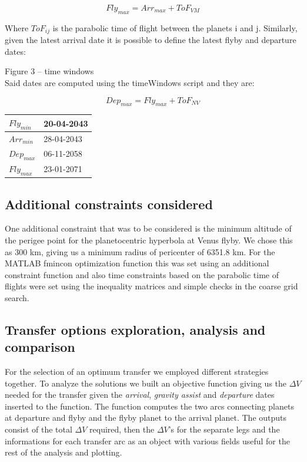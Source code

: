 \documentclass[11pt,a4paper]{report}
\begin{document}
\begin{equation*}
    Fly_{max}=Arr_{max}+ ToF_{VM}
\end{equation*}

Where $ToF_{ij}$ is the parabolic time of flight between the planets i and j.
Similarly, given the latest arrival date it is possible to define the latest flyby and departure dates:

Figure 3 – time windows\\
Said dates are computed using the timeWindows script and they are:

\begin{equation*}
    Dep_{max}=Fly_{max}+ ToF_{NV}
\end{equation*}

\begin{table}[H]
\centering
\begin{tabular}{|l|l|}
\hline
$Fly_{min}$ & 20-04-2043 \\ \hline
$Arr_{min}$ & 28-04-2043 \\ \hline
$Dep_{max}$ & 06-11-2058 \\ \hline
$Fly_{max}$ & 23-01-2071 \\ \hline
\end{tabular}
\end{table}



\subsection{Additional constraints considered}
One additional constraint that was to be considered is the minimum altitude of the perigee point for the planetocentric hyperbola at Venus flyby. We chose this as 300 km, giving us a minimum radius of pericenter of 6351.8 km. For the MATLAB fmincon optimization function this was set using an additional constraint function and also time constraints based on the parabolic time of flights were set using the inequality matrices and simple checks in the coarse grid search.

\subsection{Transfer options exploration, analysis and comparison}
For the selection of an optimum transfer we employed different strategies together.
To analyze the solutions we built an objective function giving us the $\Delta V$ needed for the transfer given the \emph{arrival}, \emph{gravity assist} and \emph{departure} dates inserted to the function. The function computes the two arcs connecting planets at departure and flyby and the flyby planet to the arrival planet. The outputs consist of the total $\Delta V$ required, then the $\Delta V$'s for the separate legs and the informations for each transfer arc as an object with various fields useful for the rest of the analysis and plotting.
\end{document}
